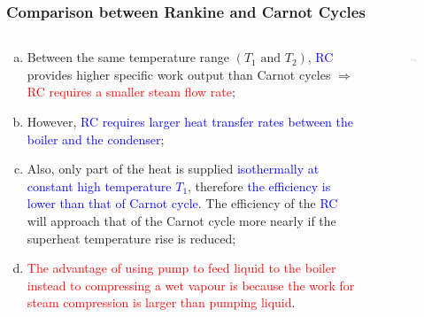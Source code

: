 \documentclass[10pt,compress]{beamer}
\newcommand{\red}{\textcolor{red}}
\newcommand{\blue}{\textcolor{blue}}
\begin{document}
\begin{frame}
 \frametitle{Comparison between Rankine and Carnot Cycles}
  \begin{columns}
   \begin{column}[c]{0.4\linewidth}
    \begin{enumerate}[(a)]\scriptsize
     \item<1-> Between the same temperature range $\left(T_{1}\text{ and }T_{2}\right)$, \blue{RC} provides higher specific work output than Carnot cycles $\Longrightarrow$ \red{RC requires a smaller steam flow rate};
     \item<2-> However, \blue{RC requires larger heat transfer rates between the boiler and the condenser};
     \item<3-> Also, only part of the heat is supplied \blue{isothermally at constant high temperature $T_{1}$}, therefore \blue{the efficiency is lower than that of Carnot cycle}. The efficiency of the \blue{RC} will approach that of the Carnot cycle more nearly if the superheat temperature rise is reduced;
     \item<4-> \red{The advantage of using pump to feed liquid to the boiler instead to compressing a wet vapour is because the work for steam compression is larger than pumping liquid}.
    \end{enumerate}
   \end{column}
   \begin{column}[c]{0.6\linewidth}
    \begin{figure}%
     \begin{center}
      \includegraphics[width=7.5cm,clip]{./Pics/Comparison_Rankine_Carnot}
     \end{center}
    \end{figure}  
   \end{column}
  \end{columns}
 \normalsize
\end{frame}
\end{document}
